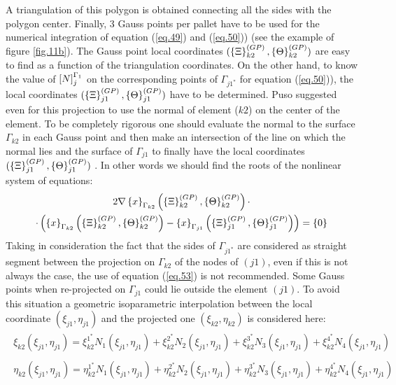 A triangulation of this polygon is obtained connecting all the sides with the polygon center. Finally, 3 Gauss points per pallet have to be used for the numerical integration of equation (\ref{eq.49}) and (\ref{eq.50})) (see the example of figure \ref{fig.11b}). The Gauss point local coordinates  $(\left\lbrace{\Xi}\right \rbrace_{k2}^{(GP)},\left\lbrace{\Theta}\right \rbrace_{k2}^{(GP)})$ are easy to find as a function of the triangulation coordinates. On the other hand, to know the value of $\left[{N}\right]_{j}^{\Gamma_1}$ on the corresponding points of $\Gamma_{j1^*}$ for equation (\ref{eq.50})), the local coordinates  $(\left\lbrace{\Xi}\right \rbrace_{j1}^{(GP)},\left\lbrace{\Theta}\right \rbrace_{j1}^{(GP)})$  have to be determined. Puso suggested even for this projection to use the normal of element ($k2$) on the center of the element. To be completely rigorous one should evaluate the normal to the surface $\Gamma_{k2}$ in each Gauss point and then make an intersection of the line on which the normal lies and the surface of $\Gamma_{j1}$ to finally have the local coordinates $(\left\lbrace{\Xi}\right \rbrace_{j1}^{(GP)},\left\lbrace{\Theta}\right \rbrace_{j1}^{(GP)})$ . In other words we should find the roots of the nonlinear system of equations:
\begin{multline}
\label{eq.53}
2\nabla\left\lbrace{x}\right \rbrace_{\Gamma_{k2}}\left(\left\lbrace{\Xi}\right \rbrace_{k2}^{(GP)},\left\lbrace{\Theta}\right \rbrace_{k2}^{(GP)}\right)\cdot \\ \cdot\left( \left\lbrace{x}\right \rbrace_{\Gamma_{k2}}\left(\left\lbrace{\Xi}\right \rbrace_{k2}^{(GP)},\left\lbrace{\Theta}\right \rbrace_{k2}^{(GP)}\right)-\left\lbrace{x}\right \rbrace_{\Gamma_{j1}}\left(\left\lbrace{\Xi}\right \rbrace_{j1}^{(GP)},\left\lbrace{\Theta}\right \rbrace_{j1}^{(GP)}\right)\right)= \left\lbrace{0}\right \rbrace
\end{multline}
Taking in consideration the fact that the sides of $\Gamma_{j1^*}$ are considered as straight segment between the projection on  $\Gamma_{k2}$ of the nodes of $(j1)$, even if this is not always the case, the use of equation (\ref{eq.53}) is not recommended. Some Gauss points when re-projected on $\Gamma_{j1}$ could lie outside the element $(j1)$. To avoid this situation a geometric isoparametric interpolation between the local coordinate $(\xi_{j1},\eta_{j1})$ and the projected one $(\xi_{k2},\eta_{k2})$ is considered here:
\begin{eqnarray}
\label{eq.54}
\begin{aligned}
\xi_{k2}\left(\xi_{j1},\eta_{j1}\right)=\xi_{k2}^{1^*}N_1\left( \xi_{j1},\eta_{j1}\right)+\xi_{k2}^{2^*}N_2\left( \xi_{j1},\eta_{j1}\right)+\xi_{k2}^{3^*}N_3\left( \xi_{j1},\eta_{j1}\right)+\xi_{k2}^{4^*}N_4\left( \xi_{j1},\eta_{j1}\right)
\end{aligned} \\
\label{eq.55}
\begin{aligned}
\eta_{k2}\left(\xi_{j1},\eta_{j1}\right)=\eta_{k2}^{1^*}N_1\left( \xi_{j1},\eta_{j1}\right)+\eta_{k2}^{2^*}N_2\left( \xi_{j1},\eta_{j1}\right)+\eta_{k2}^{3^*}N_3\left( \xi_{j1},\eta_{j1}\right)+\eta_{k2}^{4^*}N_4\left( \xi_{j1},\eta_{j1}\right) 
\end{aligned} 
\end{eqnarray}
